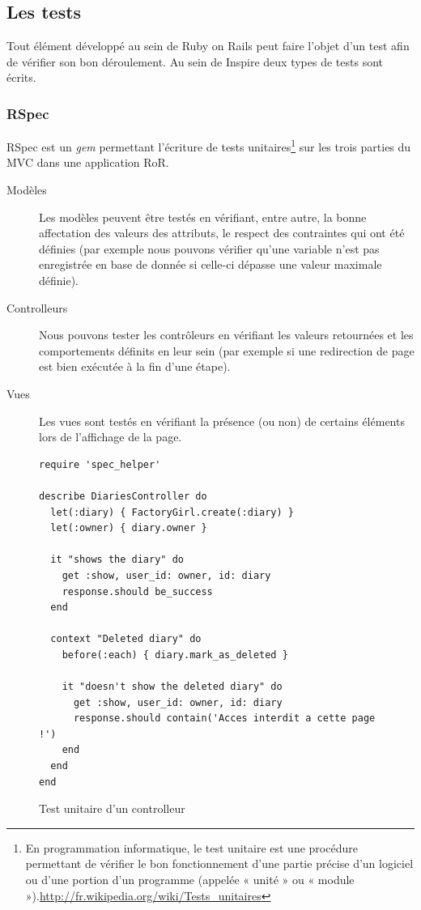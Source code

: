 \documentclass[12pt,a4paper]{book}
\begin{document}
\subsection{Les tests}

Tout élément développé au sein de Ruby on Rails peut faire l'objet d'un test afin de vérifier son bon déroulement. Au sein de Inspire deux types de tests sont écrits.

\subsubsection{RSpec}

RSpec est un \textit{gem} permettant l'écriture de tests unitaires\footnote{En programmation informatique, le test unitaire est une procédure permettant de vérifier le bon fonctionnement d'une partie précise d'un logiciel ou d'une portion d'un programme (appelée « unité » ou « module »).\url{http://fr.wikipedia.org/wiki/Tests_unitaires}} sur les trois parties du MVC dans une application RoR.
\begin{description}
	\item[Modèles] Les modèles peuvent être testés en vérifiant, entre autre, la bonne affectation des valeurs des attributs, le respect des contraintes qui ont été définies (par exemple nous pouvons vérifier qu'une variable n'est pas enregistrée en base de donnée si celle-ci dépasse une valeur maximale définie).
	\item[Controlleurs] Nous pouvons tester les contrôleurs en vérifiant les valeurs retournées et les comportements définits en leur sein (par exemple si une redirection de page est bien exécutée à la fin d'une étape).
	\item[Vues] Les vues sont testés en vérifiant la présence (ou non) de certains éléments lors de l'affichage de la page. 
\end{description}

\begin{figure}[h]
\lstset{language=ruby}
\begin{lstlisting}
require 'spec_helper'

describe DiariesController do
  let(:diary) { FactoryGirl.create(:diary) }
  let(:owner) { diary.owner }

  it "shows the diary" do
    get :show, user_id: owner, id: diary
    response.should be_success
  end

  context "Deleted diary" do
    before(:each) { diary.mark_as_deleted }

    it "doesn't show the deleted diary" do
      get :show, user_id: owner, id: diary
      response.should contain('Acces interdit a cette page !')
    end
  end
end
\end{lstlisting}
 \caption{Test unitaire d'un controlleur}
\end{figure}
\end{document}
